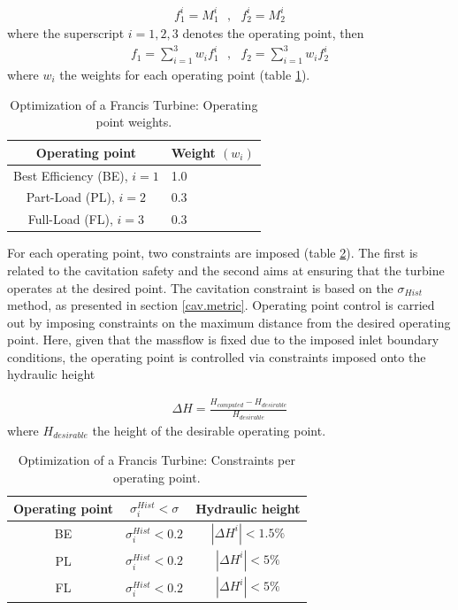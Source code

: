 \begin{eqnarray}
   f_1^i=M_1^i ~~~,~~~ f_2^i=M_2^i 
   \label{ObjFrancis} 
\end{eqnarray}
where the superscript $i=1,2,3$ denotes the operating point, then
\begin{eqnarray}
   f_1=\sum^3_{i=1}w_if_1^i ~~~,~~~ f_2=\sum^3_{i=1}w_if_2^i 
   \label{ObjFrancis2} 
\end{eqnarray}
where $w_i$ the weights for each operating point (table \ref{op-weights}).


\begin{table}[h!]
\begin{center}
\begin{tabular}{ |c|l| }
\hline
Operating point& Weight $(w_i)$\\
\hline
Best Efficiency (BE), $i=1$ & 1.0\\
\hline
Part-Load (PL), $i=2$ & 0.3\\
\hline
Full-Load (FL), $i=3$ & 0.3\\
\hline
\end{tabular}
\caption{Optimization of a Francis Turbine: Operating point weights.}
\label{op-weights}
\end{center}
\end{table}


For each operating point, two constraints are imposed (table \ref{Cons}). The first is related to the cavitation safety and the second aims at ensuring that the turbine operates at the desired point. The cavitation constraint is based on the $\sigma_{Hist}$ method, as presented in section \ref{cav.metric}. Operating point control is carried out by imposing constraints on the maximum distance from the desired operating point. Here, given that the massflow is fixed due to the imposed inlet boundary conditions, the operating point is controlled via constraints imposed onto the hydraulic height 


\begin{eqnarray}
   \Delta H=\frac{H_{computed}-H_{desirable}}{H_{desirable}} 
   \label{ConstFrancis} 
\end{eqnarray}
where $H_{desirable}$ the height of the desirable operating point.

\begin{table}[h!]
\begin{center}
\begin{tabular}{ |c|c|c| }
\hline
Operating point & $\sigma_i^{Hist}<\sigma$ & Hydraulic height\\
\hline
BE & $\sigma_i^{Hist}<0.2$ & $|\Delta H^i|<1.5\%$\\
\hline
PL       & $\sigma_i^{Hist}<0.2$ & $|\Delta H^i|<5\%$\\
\hline
FL       & $\sigma_i^{Hist}<0.2$ & $|\Delta H^i|<5\%$\\
\hline
\end{tabular}
\caption{Optimization of a Francis Turbine: Constraints per operating point.}
\label{Cons}
\end{center}
\end{table}


